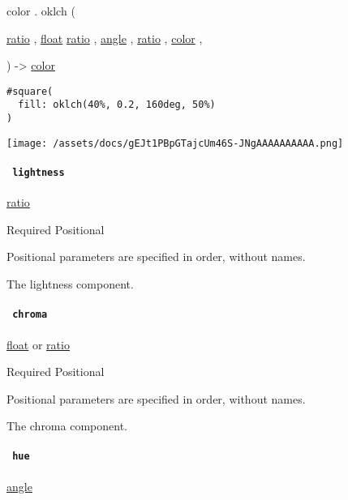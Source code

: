 color { . } { oklch } (

{ \href{/docs/reference/layout/ratio/}{ratio} , } {
\href{/docs/reference/foundations/float/}{float}
\href{/docs/reference/layout/ratio/}{ratio} , } {
\href{/docs/reference/layout/angle/}{angle} , } {
\href{/docs/reference/layout/ratio/}{ratio} , } {
\href{/docs/reference/visualize/color/}{color} , }

) -\textgreater{} \href{/docs/reference/visualize/color/}{color}

\begin{verbatim}
#square(
  fill: oklch(40%, 0.2, 160deg, 50%)
)
\end{verbatim}

\texttt{[image: /assets/docs/gEJt1PBpGTajcUm46S-JNgAAAAAAAAAA.png]}

\paragraph{\texorpdfstring{\texttt{\ lightness\ }}{ lightness }}\label{definitions-oklch-lightness}

\href{/docs/reference/layout/ratio/}{ratio}

{Required} {{ Positional }}

\label{definitions-oklch-lightness-positional-tooltip}
Positional parameters are specified in order, without names.

The lightness component.

\paragraph{\texorpdfstring{\texttt{\ chroma\ }}{ chroma }}\label{definitions-oklch-chroma}

\href{/docs/reference/foundations/float/}{float} {or}
\href{/docs/reference/layout/ratio/}{ratio}

{Required} {{ Positional }}

\label{definitions-oklch-chroma-positional-tooltip}
Positional parameters are specified in order, without names.

The chroma component.

\paragraph{\texorpdfstring{\texttt{\ hue\ }}{ hue }}\label{definitions-oklch-hue}

\href{/docs/reference/layout/angle/}{angle}

